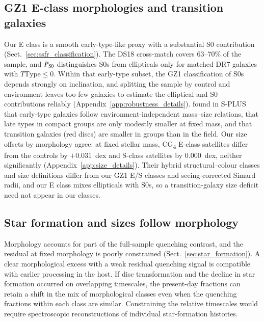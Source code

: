\documentclass{aa}
\newcommand{\CG}{CG\textsubscript{4}}
\begin{document}
\subsection{GZ1 E-class morphologies and transition galaxies}\label{sec:s0_degeneracy}


Our E class is a smooth early-type-like proxy with a substantial S0 contribution (Sect.~\ref{sec:ssfr_classification}). The DS18 cross-match covers 63--70\% of the sample, and \(P_{\rm S0}\) distinguishes S0s from ellipticals only for matched DR7 galaxies with \(T\mathrm{Type}\leq0\). Within that early-type subset, the GZ1 classification of S0s depends strongly on inclination, and splitting the sample by control and environment leaves too few galaxies to estimate the elliptical and S0 contributions reliably (Appendix~\ref{app:robustness_details}). \citet{Montaguth2026MassSize} found in S-PLUS that early-type galaxies follow environment-independent mass--size relations, that late types in compact groups are only modestly smaller at fixed mass, and that transition galaxies (red discs) are smaller in groups than in the field. Our size offsets by morphology agree: at fixed stellar mass, \CG{} E-class satellites differ from the controls by \(+0.031\)~dex and S-class satellites by \(0.000\)~dex, neither significantly (Appendix~\ref{app:size_details}). Their hybrid structural--colour classes and size definitions differ from our GZ1 E/S classes and seeing-corrected Simard radii, and our E class mixes ellipticals with S0s, so a transition-galaxy size deficit need not appear in our classes.

\subsection{Star formation and sizes follow morphology}\label{sec:weaker_signals}





Morphology accounts for part of the full-sample quenching contrast, and the residual at fixed morphology is poorly constrained (Sect.~\ref{sec:star_formation}). A clear morphological excess with a weak residual quenching signal is compatible with earlier processing in the host. If disc transformation and the decline in star formation occurred on overlapping timescales, the present-day fractions can retain a shift in the mix of morphological classes even when the quenching fractions within each class are similar. Constraining the relative timescales would require spectroscopic reconstructions of individual star-formation histories.
\end{document}
